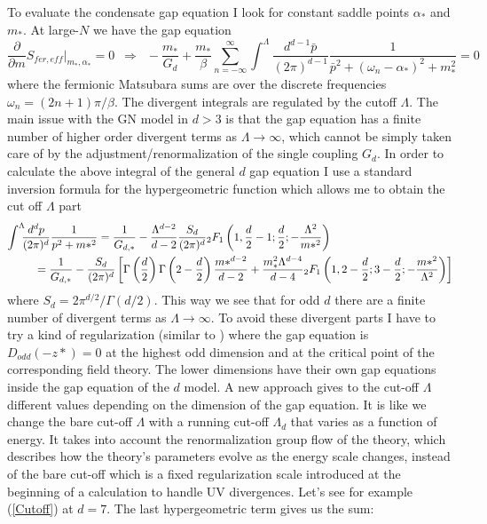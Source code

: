 \documentclass[twoside]{article}
\begin{document}
 To evaluate the condensate gap equation I look for constant saddle points $\alpha_*$ and $m_*$. At large-$N$ we have the gap equation
 \begin{equation}
 	\frac{\partial}{\partial m}S_{fer,eff}\Biggl|_{m_*,\alpha_*}\!\!\!\!=0\,\,\,\Rightarrow\,\,\, -\frac{m_*}{G_d}+\frac{m_*}{\beta}\sum_{n=-\infty}^\infty\int^\Lambda\!\!\frac{d^{d-1} \bar{p}}{(2\pi)^{d-1}}\frac{1}{\bar{p}^2+(\omega_n-\alpha_*)^2+m_*^2}=0
 \end{equation}
 where  the fermionic Matsubara sums are over the discrete frequencies $\omega_n=(2n+1)\pi/\beta$. The divergent integrals are regulated by the cutoff $\Lambda$. 
 The main issue with the GN model in $d>3$ is that the gap equation has  a finite number of higher order divergent terms as $\Lambda\rightarrow\infty$, which cannot be simply taken care of by the adjustment/renormalization of the single coupling $G_d$. In order to calculate the above integral of the general $d$ gap equation I use a standard inversion formula for the hypergeometric function which allows me to obtain the cut off $\Lambda$ part 
\begin{align}
\label{Cutoff}
\int^\Lambda\!\!\!\frac{d^d p}{(2\pi)^d}\frac{1}{p^2+m*^2} &= \frac{1}{G_{d,*}}-\frac{\Lambda^{d-2}}{d-2}\frac{S_d}{(2\pi)^d}{}_2F_1\left(1,\frac{d}{2}-1;\frac{d}{2};-\frac{\Lambda^2}{m*^2}\right)\nonumber\\
&\hspace{-2cm}=\frac{1}{G_{d,*}}-\frac{S_d}{(2\pi)^d}\left[\Gamma\left(\frac{d}{2}\right)\Gamma\left(2-\frac{d}{2}\right)\frac{m*^{d-2}}{d-2}+\frac{m^2_*\Lambda^{d-4}}{d-4}{}_2F_1\left(1,2-\frac{d}{2};3-\frac{d}{2};-\frac{m*^2}{\Lambda^2}\right)\right]
\end{align}
where $S_d=2\pi^{d/2}/\Gamma(d/2)$. This way we  see that for odd $d$ there are a finite number of divergent terms as $\Lambda\rightarrow\infty$. To avoid these divergent parts I have to try a kind of regularization (similar to \cite{Filothodoros Lattices}) where the gap equation is $D_{odd}(-z*)=0$ at the highest odd dimension and at the critical point of the corresponding field theory. The lower dimensions have their own gap equations inside the gap equation of the $d$ model. A new approach gives to the cut-off $\Lambda$ different values depending on the dimension of the gap equation. It is like we change the bare cut-off $\Lambda$ with a running cut-off $\Lambda_d$ that varies as a function of energy. It takes into account the renormalization group flow of the theory, which describes how the theory's parameters evolve as the energy scale changes, instead of the bare cut-off which is a fixed regularization scale introduced at the beginning of a calculation to handle UV divergences. Let's see for example ({\ref{Cutoff}}) at $d=7$. The last hypergeometric term gives us the sum:
\end{document}
